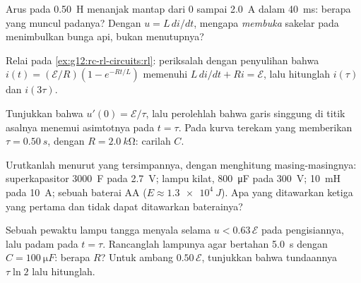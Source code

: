 \begin{exercise}[$\star\star$]\label{exo:g12:rc-rl-circuits:9}
Arus pada  \qty{0.50}{H} menanjak mantap dari $0$ sampai
\qty{2.0}{A} dalam \qty{40}{ms}:  berapa yang muncul padanya? Dengan
$u = L\,di/dt$, mengapa \emph{membuka} sakelar pada  menimbulkan bunga api, bukan menutupnya?
\end{exercise}

\begin{exercise}[$\star\star$]\label{exo:g12:rc-rl-circuits:10}
Relai pada \cref{ex:g12:rc-rl-circuits:rl}: periksalah dengan penyulihan bahwa
$i(t) = (\mathcal{E}/R)(1 - e^{-Rt/L})$ memenuhi
$L\,di/dt + Ri = \mathcal{E}$, lalu hitunglah $i(\tau)$ dan $i(3\tau)$.
\end{exercise}

\begin{exercise}[$\star\star$]\label{exo:g12:rc-rl-circuits:11}
Tunjukkan bahwa $u'(0) = \mathcal{E}/\tau$, lalu perolehlah bahwa garis singgung di
titik asalnya menemui asimtotnya pada $t = \tau$. Pada kurva terekam yang
memberikan $\tau = \qty{0.50}{s}$, dengan $R = \qty{2.0}{k\ohm}$: carilah $C$.
\end{exercise}

\begin{exercise}[$\star\star\star$]\label{exo:g12:rc-rl-circuits:12}
Urutkanlah menurut  yang tersimpannya, dengan menghitung masing-masingnya: superkapasitor
\qty{3000}{F} pada \qty{2.7}{V};  lampu kilat, \qty{800}{\micro F} pada
\qty{300}{V};  \qty{10}{mH} pada \qty{10}{A}; sebuah baterai AA
($E \approx \qty{1.3e4}{J}$). Apa yang ditawarkan ketiga yang pertama dan tidak dapat
ditawarkan baterainya?
\end{exercise}

\begin{exercise}[$\star\star\star$]\label{exo:g12:rc-rl-circuits:13}
Sebuah pewaktu lampu tangga menyala selama $u < 0.63\,\mathcal{E}$ pada
 pengisiannya, lalu padam pada $t = \tau$. Rancanglah lampunya agar bertahan
\qty{5.0}{s} dengan $C = \qty{100}{\micro F}$: berapa $R$? Untuk ambang
$0.50\,\mathcal{E}$, tunjukkan bahwa tundaannya $\tau \ln 2$ lalu hitunglah.
\end{exercise}

